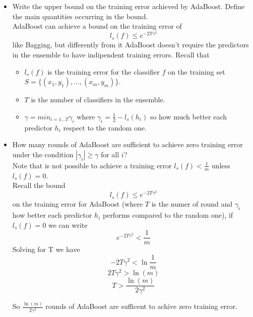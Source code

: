 \begin{itemize}
    \item Write the upper bound on the training error achieved by AdaBoost. Define the main quantities occurring in the bound.\\
        
        AdaBoost can achieve a bound on the training error of $$l_s(f) \leq e^{-2T\gamma^2}$$ like Bagging, but differently from it AdaBoost doesn't 
        require the predictors in the ensemble to have indipendent training errors. 
        Recall that 
        \begin{itemize}
            \item $l_s(f)$ is the training error for the classifier $f$ on the training set $S = \{(x_1 , y_1),\dots,(x_m , y_m)\}$.\\
            \item $T$ is the number of classifiers in the ensemble.\\
            \item $\gamma = min_{i=1 \dots T} \gamma_i$ where  $\gamma_i = \frac{1}{2} - l_s(h_i)$ so how much better each predictor $h_i$ respect to the random one.\\
        \end{itemize}
        
    \item How many rounds of AdaBoost are sufficient to achieve zero training error under the condition $|\gamma_i| \geq \gamma$ for all $i$?\\
        
        Note that is not possible to achieve a training error $l_s(f) < \frac{1}{m}$ unless $l_s(f) = 0$.\\
        Recall the bound $$l_s(f) \leq e^{-2T\gamma^2}$$ on the training error for AdaBoost (where $T$ is the numer of round and $\gamma_i$ how better 
        each predictor $h_i$ performs compared to the random one), 
        if $l_s(f) = 0$ we can write $$e^{-2T\gamma^2} < \frac{1}{m}$$
        Solving for T we have
        $$-2T\gamma^2 < \ln{\frac{1}{m}}$$
        $$2T\gamma^2 > \ln(m)$$
        $$T > \frac{\ln(m)}{2\gamma^2}$$

        So $\frac{\ln(m)}{2\gamma^2}$ rounds of AdaBoost are sufficent to achive zero training error.
        
    \end{itemize}
    